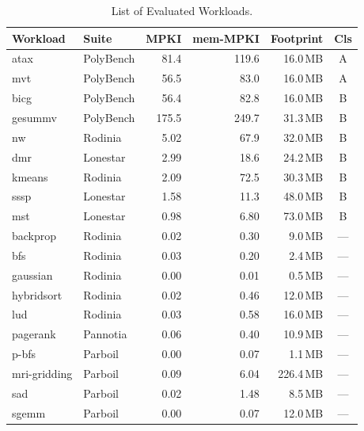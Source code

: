 \begin{table}[t]
  \centering
  \caption{List of Evaluated Workloads.}
  \label{tab:workloads}
  \scriptsize
  \setlength{\tabcolsep}{4pt}
  \renewcommand{\arraystretch}{1.05}
  \begin{tabular}{@{}llrrrc@{}}
    \toprule
    \textbf{Workload} & \textbf{Suite} & \textbf{MPKI} & \textbf{mem-MPKI} & \textbf{Footprint} & \textbf{Cls} \\
    \midrule
    atax            & PolyBench & 81.4   & 119.6  & 16.0\,MB   & A \\
    mvt               & PolyBench & 56.5   & 83.0   & 16.0\,MB   & A \\
    \midrule
    bicg            & PolyBench & 56.4   & 82.8   & 16.0\,MB   & B \\
    gesummv           & PolyBench & 175.5  & 249.7  & 31.3\,MB   & B \\
    nw                  & Rodinia   & 5.02   & 67.9   & 32.0\,MB   & B \\
    dmr                  & Lonestar  & 2.99   & 18.6   & 24.2\,MB   & B \\
    kmeans              & Rodinia   & 2.09   & 72.5   & 30.3\,MB   & B \\
    sssp           & Lonestar  & 1.58   & 11.3   & 48.0\,MB   & B \\
    mst                & Lonestar  & 0.98   & 6.80   & 73.0\,MB   & B \\
    \midrule
    backprop          & Rodinia   & 0.02   & 0.30   & 9.0\,MB    & --- \\
    bfs                & Rodinia   & 0.03   & 0.20   & 2.4\,MB    & --- \\
    gaussian            & Rodinia   & 0.00   & 0.01   & 0.5\,MB    & --- \\
    hybridsort          & Rodinia   & 0.02   & 0.46   & 12.0\,MB   & --- \\
    lud                 & Rodinia   & 0.03   & 0.58   & 16.0\,MB   & --- \\
    pagerank                  & Pannotia  & 0.06   & 0.40   & 10.9\,MB   & --- \\
    p-bfs                & Parboil   & 0.00   & 0.07   & 1.1\,MB    & --- \\
    mri-gridding         & Parboil   & 0.09   & 6.04   & 226.4\,MB  & --- \\
    sad                       & Parboil   & 0.02   & 1.48   & 8.5\,MB    & --- \\
    sgemm               & Parboil   & 0.00   & 0.07   & 12.0\,MB   & --- \\

\end{tabular}
\end{table}
